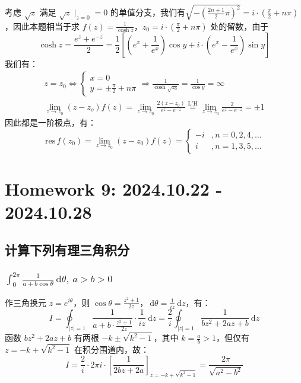 \documentclass[UTF8]{report}
\def\res{\mathrm{\,res\,}}
\theoremstyle{MyLineTheoremStyle} %
\theoremstyle{MyBlockTheoremStyle} %
\theoremstyle{MySubsubsectionStyle} %
\begin{document}
\begin{enumerate}
考虑 $\sqrt{z}$ 满足 $\sqrt{z}\mid_{z = 0} = 0$ 的单值分支，我们有$\sqrt{-\left(\frac{2n + 1}{2} \pi\right)^2} = i\cdot \left(\frac{\pi}{2} + n\pi\right)$，因此本题相当于求 $f(z) = \frac{1}{\cosh z}$，$z_0 =i \cdot \left(\frac{\pi}{2} + n\pi\right)$ 处的留数，由于 
\begin{equation}
    \cosh z = \frac{e^z + e^{-z}}{2} = \frac{1}{2}\left[\left(e^x + \frac{1}{e^x}\right)\cos y + i\cdot\left(e^x - \frac{1}{e^x}\right)\sin y\right]
\end{equation}
我们有：
\begin{gather}
    z = z_0 \Longleftrightarrow 
    \begin{cases}
    x = 0 \\ 
    y = \pm \frac{\pi}{2} + n\pi
    \end{cases} \Longrightarrow \frac{1}{\cosh \sqrt{z_0}} = \frac{1}{\cos y} = \infty \\ 
    \lim_{z \to z_0} (z - z_o)f(z) = \lim_{z \to z_0} \frac{2(z - z_0)}{e^z - e^{-z}} \overset{\text{L'H}}{=} \lim_{z \to z_0} \frac{2}{e^z - e^{-z}} = \pm 1
\end{gather}
因此都是一阶极点，有：
\begin{equation}
\res f(z_0) = \lim_{z\to z_0}(z - z_0)f(z) = 
\begin{cases}
    -i &, n = 0, 2, 4, \dots \\
    i &, n = 1, 3, 5, \dots
\end{cases}
\end{equation}

\end{enumerate}

\chapter{Homework 9: 2024.10.22 - 2024.10.28}
\thispagestyle{fancy}

\section{计算下列有理三角积分}

\subsection{$\displaystyle \int_{0}^{2\pi}\frac{1}{a + b\cos \theta}\ \mathrm{d}\theta, \ a > b > 0$}

作三角换元 $z = e^{i \theta}$，则 $\cos \theta = \frac{z^2 + 1}{2z}$，$\ \mathrm{d} \theta = \frac{1}{iz} \ \mathrm{d}z$，有：
\begin{equation}
I = \oint_{|z| = 1}  \frac{1}{a + b\cdot \frac{z^2 + 1}{2z}} \cdot \frac{1}{iz} \ \mathrm{d}z
= \frac{2}{i} \oint_{|z| = 1} \frac{1}{bz^2 + 2az + b} \ \mathrm{d}z
\end{equation}
函数 $bz^2 + 2az + b$ 有两根 $- k \pm \sqrt{k^2 - 1}$，其中 $k = \frac{a}{b} > 1$，但仅有 $z = - k + \sqrt{k^2 - 1}$ 在积分围道内，故：
\begin{equation}
    \boxed{
        I = \frac{2}{i} \cdot 2\pi i \cdot \left[\frac{1}{2bz + 2a}\right]_{z =  - k + \sqrt{k^2 - 1}}
    = \frac{2\pi}{\sqrt{a^2 - b^2}}
    }
\end{equation}
\end{document}
